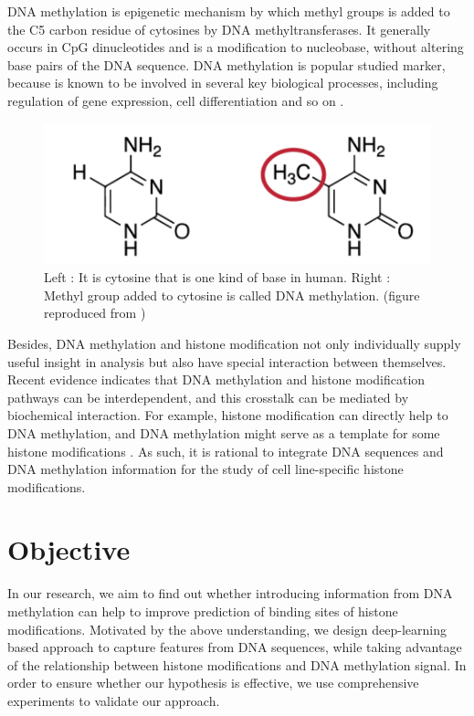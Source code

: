 DNA methylation is epigenetic mechanism by which methyl groups is added to the C5 carbon residue of cytosines by DNA methyltransferases. It generally occurs in CpG dinucleotides and is a modification to nucleobase, without altering base pairs of the DNA sequence. DNA methylation is popular studied marker, because is known to be involved in several key biological processes, including regulation of gene expression, cell differentiation and so on \cite{krueger2012dna}.

\begin{figure}[H]
    \centering
    \includegraphics[width=0.8\columnwidth]{body/figure/figure2.png}
    \captionsetup{labelfont=bf}
    \renewcommand{\baselinestretch}{1.0}
    \caption[An illustration of DNA methylation]{Left : It is cytosine that is one kind of base in human. Right : Methyl group added to cytosine is called DNA methylation.  (figure reproduced from \cite{enwiki:1028802025})}
    \label{f2}
\end{figure}

Besides, DNA methylation and histone modification not only individually supply useful insight in analysis but also have special interaction between themselves. Recent evidence indicates that DNA methylation and histone modification pathways can be interdependent, and this crosstalk can be mediated by biochemical interaction. For example, histone modification can directly help to DNA methylation, and DNA methylation might serve as a template for some histone modifications \cite{cedar2009linking}. As such, it is rational to integrate DNA sequences and DNA methylation information for the study of cell line-specific histone modifications.

\section{Objective}
In our research, we aim to find out whether introducing information from DNA methylation can help to improve prediction of binding sites of histone modifications. Motivated by the above understanding, we design deep-learning based approach to capture features from DNA sequences, while taking advantage of the relationship between histone modifications and DNA methylation signal. In order to ensure whether our hypothesis is effective, we use comprehensive experiments to validate our approach.